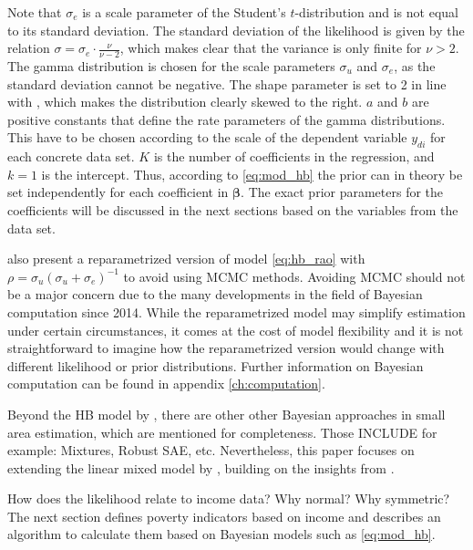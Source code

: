 Note that $\sigma_e$ is a scale parameter of the Student's $t$-distribution and is not equal to its standard deviation.
The standard deviation of the likelihood is given by the relation $\sigma = \sigma_e \cdot \frac{\nu}{\nu - 2}$, which makes clear that the variance is only finite for $\nu > 2$.
The gamma distribution is chosen for the scale parameters $\sigma_u$ and $\sigma_e$, as the standard deviation cannot be negative.
The shape parameter is set to 2 in line with \cite{gelman_prior_2020}, which makes the distribution clearly skewed to the right.
$a$ and $b$ are positive constants that define the rate parameters of the gamma distributions.
This have to be chosen according to the scale of the dependent variable $y_{di}$ for each concrete data set.
$K$ is the number of coefficients in the regression, and $k = 1$ is the intercept.
Thus, according to \ref{eq:mod_hb} the prior can in theory be set independently for each coefficient in $\boldsymbol \beta$.
The exact prior parameters for the coefficients will be discussed in the next sections based on the variables from the data set.


\cite{molina_small_2014} also present a reparametrized version of model \ref{eq:hb_rao} with $\rho = \sigma_u(\sigma_u + \sigma_e)^{-1} $ to avoid using MCMC methods.
Avoiding MCMC should not be a major concern due to the many developments in the field of Bayesian computation since 2014.
While the reparametrized model may simplify estimation under certain circumstances, it comes at the cost of model flexibility and it is not straightforward to imagine how the reparametrized version would change with different likelihood or prior distributions.
Further information on Bayesian computation can be found in appendix \ref{ch:computation}.

Beyond the HB model by \cite{molina_small_2014}, there are other other Bayesian approaches in small area estimation, which are mentioned for completeness. Those INCLUDE for example: Mixtures, Robust SAE, etc.
Nevertheless, this paper focuses on extending the linear mixed model by \cite{molina_small_2014}, building on the insights from \cite{morelli_hierarchical_2021}.

How does the likelihood relate to income data? Why normal? Why symmetric?
The next section defines poverty indicators based on income and describes an algorithm to calculate them based on Bayesian models such as \ref{eq:mod_hb}.